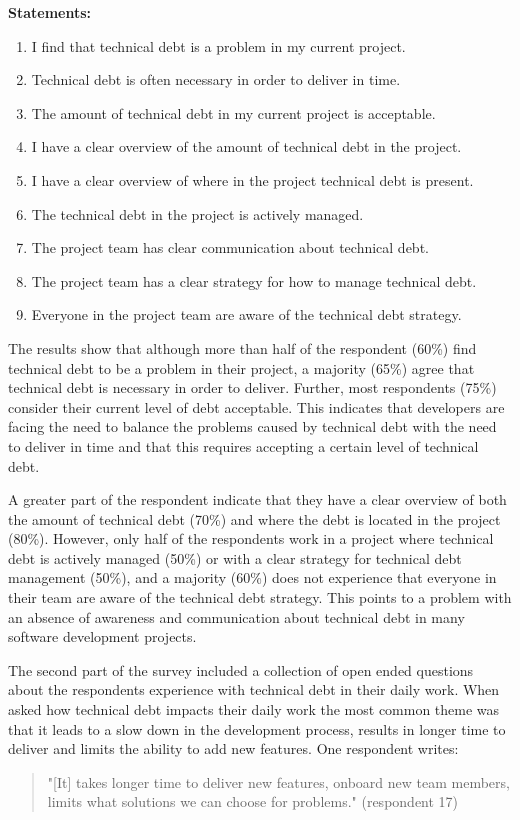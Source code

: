 \smallskip
\textbf{Statements:}
\begin{enumerate}[label=\alph*)]
  \item I find that technical debt is a problem in my current project.
  \item Technical debt is often necessary in order to deliver in time.
  \item The amount of technical debt in my current project is acceptable.
  \item I have a clear overview of the amount of technical debt in the project.
  \item I have a clear overview of where in the project technical debt is present.
  \item The technical debt in the project is actively managed.
  \item The project team has clear communication about technical debt.
  \item The project team has a clear strategy for how to manage technical debt.
  \item Everyone in the project team are aware of the technical debt strategy.
\end{enumerate}
\smallskip



The results show that although more than half of the respondent (60\%) find technical debt to be a problem in their project, a majority (65\%) agree that technical debt is necessary in order to deliver.
Further, most respondents (75\%) consider their current level of debt acceptable.
This indicates that developers are facing the need to balance the problems caused by technical debt with the need to deliver in time and that this requires accepting a certain level of technical debt.

A greater part of the respondent indicate that they have a clear overview of both the amount of technical debt (70\%) and where the debt is located in the project (80\%).
However, only half of the respondents work in a project where technical debt is actively managed (50\%) or with a clear strategy for technical debt management (50\%), and a majority (60\%) does not experience that everyone in their team are aware of the technical debt strategy.
This points to a problem with an absence of awareness and communication about technical debt in many software development projects.

The second part of the survey included a collection of open ended questions about the respondents experience with technical debt in their daily work.
When asked how technical debt impacts their daily work the most common theme was that it leads to a slow down in the development process, results in longer time to deliver and limits the ability to add new features.
One respondent writes:
\begin{quote}
  "[It] takes longer time to deliver new features, onboard new team members, limits what solutions we can choose for problems." (respondent 17)
\end{quote}

